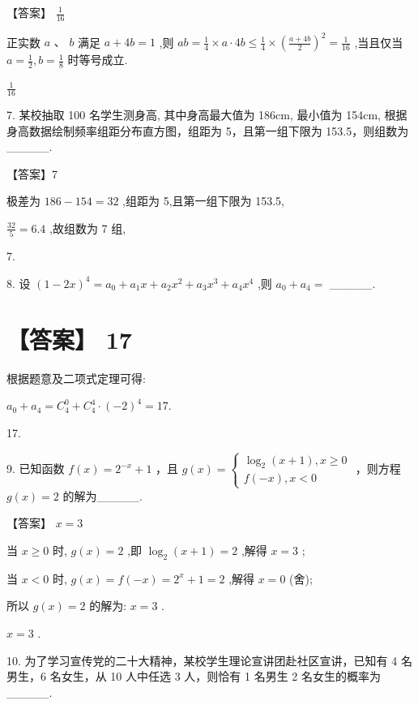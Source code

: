 \documentclass[10pt]{article}
\begin{document}
【答案】 \(\frac{1}{16}\)

正实数 \(a\text{ 、 }b\) 满足 \(a + {4b} = 1\) ,则 \({ab} = \frac{1}{4} \times  a \cdot  {4b} \leq  \frac{1}{4} \times  {\left( \frac{a + {4b}}{2}\right) }^{2} = \frac{1}{16}\) ,当且仅当 \(a = \frac{1}{2},b = \frac{1}{8}\) 时等号成立.

\(\frac{1}{16}\)

7. 某校抽取 100 名学生测身高, 其中身高最大值为 186cm, 最小值为 154cm, 根据身高数据绘制频率组距分布直方图，组距为 5，且第一组下限为 153.5，则组数为\_\_\_\_\_.

【答案】7

极差为 \({186} - {154} = {32}\) ,组距为 5,且第一组下限为 153.5,

\(\frac{32}{5} = {6.4}\) ,故组数为 7 组,

7.

8. 设 \({\left( 1 - 2x\right) }^{4} = {a}_{0} + {a}_{1}x + {a}_{2}{x}^{2} + {a}_{3}{x}^{3} + {a}_{4}{x}^{4}\) ,则 \({a}_{0} + {a}_{4} =\) \_\_\_\_\_.

\section*{【答案】 17}

根据题意及二项式定理可得:

\({a}_{0} + {a}_{4} = {C}_{4}^{0} + {C}_{4}^{4} \cdot  {\left( -2\right) }^{4} = {17}.\)

17.

9. 已知函数 \(f\left( x\right)  = {2}^{-x} + 1\) ，且 \(g\left( x\right)  = \left\{  \begin{array}{l} {\log }_{2}\left( {x + 1}\right) ,x \geq  0 \\  f\left( {-x}\right) ,x < 0 \end{array}\right.\) ，则方程 \(g\left( x\right)  = 2\) 的解为\_\_\_\_\_.

【答案】 \(x = 3\)

当 \(x \geq  0\) 时, \(g\left( x\right)  = 2\) ,即 \({\log }_{2}\left( {x + 1}\right)  = 2\) ,解得 \(x = 3\) ;

当 \(x < 0\) 时, \(g\left( x\right)  = f\left( {-x}\right)  = {2}^{x} + 1 = 2\) ,解得 \(x = 0\) (舍);

所以 \(g\left( x\right)  = 2\) 的解为: \(x = 3\) .

\(x = 3\) .

10. 为了学习宣传党的二十大精神，某校学生理论宣讲团赴社区宣讲，已知有 4 名男生，6 名女生，从 10 人中任选 3 人，则恰有 1 名男生 2 名女生的概率为\_\_\_\_\_.
\end{document}
